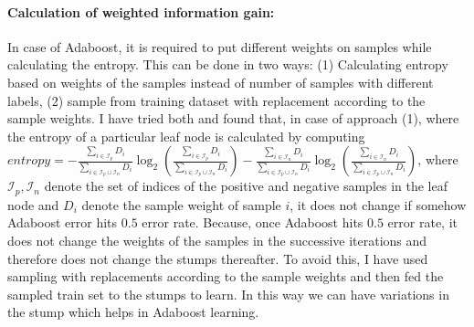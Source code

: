 \paragraph{Calculation of weighted information gain:}In case of Adaboost, it is required to put different weights on samples while calculating the entropy. This can be done in two ways: (1) Calculating entropy based on weights of the samples instead of number of samples with different labels, (2) sample from training dataset with replacement according to the sample weights. I have tried both and found that, in case of approach (1), where the entropy of a particular leaf node is calculated by computing $entropy = -\frac{\sum_{i \in \mathcal{I}_p}D_i}{\sum_{i\in \mathcal{I}_p\cup\mathcal{I}_n}D_i}\log_2(\frac{\sum_{i \in \mathcal{I}_p}D_i}{\sum_{i\in \mathcal{I}_p\cup\mathcal{I}_n}D_i})-\frac{\sum_{i \in \mathcal{I}_n}D_i}{\sum_{i\in \mathcal{I}_p\cup\mathcal{I}_n}D_i}\log_2(\frac{\sum_{i \in \mathcal{I}_n}D_i}{\sum_{i\in \mathcal{I}_p\cup\mathcal{I}_n}D_i})$, where $\mathcal{I}_p, \mathcal{I}_n$ denote the set of indices of the positive and negative samples in the leaf node and $D_i$ denote the sample weight of sample $i$, it does not change if somehow Adaboost error hits $0.5$ error rate. Because, once Adaboost hits $0.5$ error rate, it does not change the weights of the samples in the successive iterations and therefore does not change the stumps thereafter. To avoid this, I have used sampling with replacements according to the sample weights and then fed the sampled train set to the stumps to learn. In this way we can have variations in the stump which helps in Adaboost learning.
